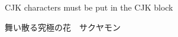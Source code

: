 \documentclass{article}
\begin{document}
CJK characters must be put in the CJK block

\begin{CJK}{UTF8}{min}舞い散る究極の花　サクヤモン\end{CJK}
\end{document}
